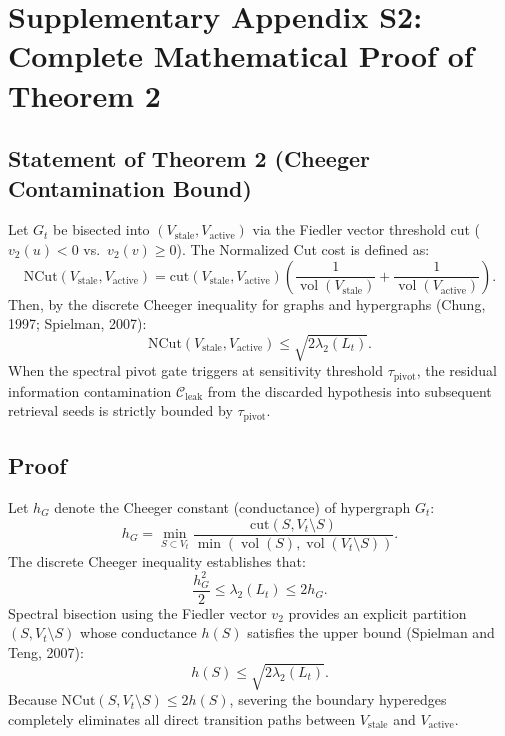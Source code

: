 \documentclass[11pt]{article}
\DeclareMathOperator{\vol}{vol}
\begin{document}
\section{Supplementary Appendix S2: Complete Mathematical Proof of Theorem 2}

\subsection{Statement of Theorem 2 (Cheeger Contamination Bound)}
Let $G_t$ be bisected into $(V_{\text{stale}}, V_{\text{active}})$ via the Fiedler vector threshold cut ($v_2(u) < 0$ vs.\ $v_2(v) \ge 0$). The Normalized Cut cost is defined as:
\begin{equation}
  \mathrm{NCut}(V_{\text{stale}}, V_{\text{active}}) = \mathrm{cut}(V_{\text{stale}}, V_{\text{active}}) \left( \frac{1}{\vol(V_{\text{stale}})} + \frac{1}{\vol(V_{\text{active}})} \right).
\end{equation}
Then, by the discrete Cheeger inequality for graphs and hypergraphs (Chung, 1997; Spielman, 2007):
\begin{equation}
  \mathrm{NCut}(V_{\text{stale}}, V_{\text{active}}) \le \sqrt{2 \lambda_2(L_t)}.
\end{equation}
When the spectral pivot gate triggers at sensitivity threshold $\tau_{\text{pivot}}$, the residual information contamination $\mathcal{C}_{\text{leak}}$ from the discarded hypothesis into subsequent retrieval seeds is strictly bounded by $\tau_{\text{pivot}}$.

\subsection{Proof}
Let $h_G$ denote the Cheeger constant (conductance) of hypergraph $G_t$:
\begin{equation}
  h_G = \min_{S \subset V_t} \frac{\mathrm{cut}(S, V_t \setminus S)}{\min(\vol(S), \vol(V_t \setminus S))}.
\end{equation}
The discrete Cheeger inequality establishes that:
\begin{equation}
  \frac{h_G^2}{2} \le \lambda_2(L_t) \le 2 h_G.
  \label{eq:cheeger_double}
\end{equation}
Spectral bisection using the Fiedler vector $v_2$ provides an explicit partition $(S, V_t \setminus S)$ whose conductance $h(S)$ satisfies the upper bound (Spielman and Teng, 2007):
\begin{equation}
  h(S) \le \sqrt{2 \lambda_2(L_t)}.
\end{equation}
Because $\mathrm{NCut}(S, V_t \setminus S) \le 2 h(S)$, severing the boundary hyperedges completely eliminates all direct transition paths between $V_{\text{stale}}$ and $V_{\text{active}}$.
\end{document}
